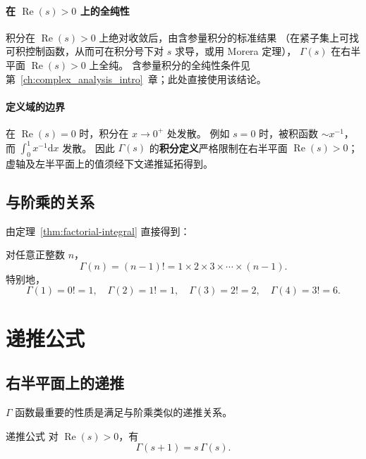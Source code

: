 \paragraph{在 $\operatorname{Re}(s)>0$ 上的全纯性}
积分在 $\operatorname{Re}(s)>0$ 上绝对收敛后，由含参量积分的标准结果
（在紧子集上可找可积控制函数，从而可在积分号下对 $s$ 求导，或用 Morera 定理），
$\Gamma(s)$ 在右半平面 $\operatorname{Re}(s)>0$ 上全纯。
含参量积分的全纯性条件见第~\ref{ch:complex_analysis_intro}~章；此处直接使用该结论。

\paragraph{定义域的边界}
在 $\operatorname{Re}(s) = 0$ 时，积分在 $x \to 0^+$ 处发散。
例如 $s = 0$ 时，被积函数 $\sim x^{-1}$，而 $\int_0^1 x^{-1}\mathrm{d} x$ 发散。
因此 $\Gamma(s)$ 的\textbf{积分定义}严格限制在右半平面 $\operatorname{Re}(s) > 0$；
虚轴及左半平面上的值须经下文递推延拓得到。


\subsection{与阶乘的关系}

由定理~\ref{thm:factorial-integral} 直接得到：

\begin{corollary}{}{}\label{cor:gamma-factorial}
对任意正整数 $n$，
\[
\Gamma(n) = (n-1)! = 1 \times 2 \times 3 \times \cdots \times (n-1).
\]
特别地，
\[
\Gamma(1) = 0! = 1, \quad \Gamma(2) = 1! = 1, \quad \Gamma(3) = 2! = 2, \quad \Gamma(4) = 3! = 6.
\]
\end{corollary}

\section{递推公式}\label{sec:gamma_recurrence}

\subsection{右半平面上的递推}

$\Gamma$ 函数最重要的性质是满足与阶乘类似的递推关系。

\begin{theorem}{递推公式}{}\label{thm:gamma-recurrence}
对 $\operatorname{Re}(s) > 0$，有
\begin{equation}
    \Gamma(s+1) = s \,\Gamma(s).
    \label{eq:gamma-recurrence}
\end{equation}
\end{theorem}

